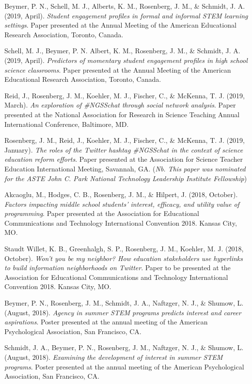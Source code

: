 \documentclass[14,]{article}
\begin{document}
Beymer, P. N., Schell, M. J., Alberts, K. M., Rosenberg, J. M., \&
Schmidt, J. A. (2019, April). \emph{Student engagement profiles in
formal and informal STEM learning settings}. Paper presented at the
Annual Meeting of the American Educational Research Association,
Toronto, Canada.

Schell, M. J., Beymer, P. N. Albert, K. M., Rosenberg, J. M., \&
Schmidt, J. A. (2019, April). \emph{Predictors of momentary student
engagement profiles in high school science classrooms}. Paper presented
at the Annual Meeting of the American Educational Research Association,
Toronto, Canada.

Reid, J., Rosenberg, J. M., Koehler, M. J., Fischer, C., \& McKenna, T.
J. (2019, March). \emph{An exploration of \#NGSSchat through social
network analysis}. Paper presented at the National Association for
Research in Science Teaching Annual International Conference, Baltimore,
MD.

Rosenberg, J. M., Reid, J., Koehler, M. J., Fischer, C., \& McKenna, T.
J. (2019, January). \emph{The roles of the Twitter hashtag \#NGSSchat in
the context of science education reform efforts}. Paper presented at the
Association for Science Teacher Education International Meeting,
Savannah, GA. (\emph{Nb. This paper was nominated for the ASTE John C.
Park National Technology Leadership Institute Fellowship})

Akcaoglu, M., Hodges, C. B., Rosenberg, J. M., \& Hilpert, J. (2018,
October). \emph{Factors impacting middle school students' interest,
efficacy, and utility value of programming}. Paper presented at the
Association for Educational Communications and Technology International
Convention 2018. Kansas City, MO.

Staudt Willet, K. B., Greenhalgh, S. P., Rosenberg, J. M., Koehler, M.
J. (2018, October). \emph{Won't you be my neighbor? How education
stakeholders use hyperlinks to build information neighborhoods on
Twitter}. Paper to be presented at the Association for Educational
Communications and Technology International Convention 2018. Kansas
City, MO.

Beymer, P. N., Rosenberg, J. M., Schmidt, J. A., Naftzger, N. J., \&
Shumow, L. (August, 2018). \emph{Agency in summer STEM programs predicts
interest and career aspirations}. Poster presented at the annual meeting
of the American Psychological Association, San Francisco, CA.

Schmidt, J. A., Beymer, P. N., Rosenberg, J. M., Naftzger, N. J., \&
Shumow, L. (August, 2018). \emph{Examining the development of interest
in summer STEM programs}. Poster presented at the annual meeting of the
American Psychological Association, San Francisco, CA.
\end{document}
